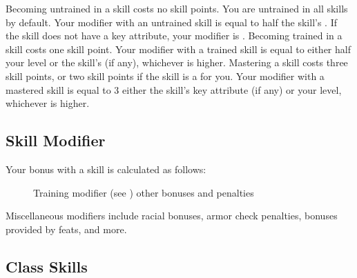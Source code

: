         \begin{itemize}
             Becoming untrained in a skill costs no skill points.
                You are untrained in all skills by default.
                Your modifier with an untrained skill is equal to half the skill's .
                If the skill does not have a key attribute, your modifier is .
             Becoming trained in a skill costs one skill point.
                Your modifier with a trained skill is equal to either half your level  or the skill's  (if any), whichever is higher.
             Mastering a skill costs three skill points, or two skill points if the skill is a  for you.
                Your modifier with a mastered skill is equal to 3 \add either the skill's key attribute (if any) or your level, whichever is higher.
        \end{itemize}

    \subsection{Skill Modifier}\label{Skill Modifier}

        Your bonus with a skill is calculated as follows:

        \begin{figure}[h]
            \centering Training modifier (see ) \add other bonuses and penalties
        \end{figure}

         Miscellaneous modifiers include racial bonuses, armor check penalties, bonuses provided by feats, and more.

    \subsection{Class Skills}

